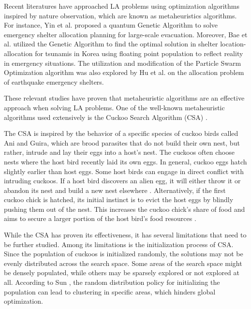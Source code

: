 \documentclass{article}
\begin{document}
Recent literatures have approached LA problems using optimization algorithms inspired by nature observation, which are known as metaheuristics algorithms. For instance, Yin et al. \cite{10.3389/fpubh.2022.1098675} proposed a quantum Genetic Algorithm to solve emergency shelter allocation planning for large-scale evacuation. Moreover, Bae et al. \cite{bae2019shelter} utilized the Genetic Algorithm to find the optimal solution in shelter location-allocation for tsunamis in Korea using floating point population to reflect reality in emergency situations. The utilization and modification of the Particle Swarm Optimization algorithm was also explored by Hu et al. \cite{hu2012modified} on the allocation problem of earthquake emergency shelters. 

These relevant studies have proven that metaheuristic algorithms are an effective approach when solving LA problems. One of the well-known metaheuristic algorithms used extensively is the Cuckoo Search Algorithm (CSA) \cite{yang2009cuckoo}. 

The CSA is inspired by the behavior of a specific species of cuckoo birds called Ani and Guira, which are brood parasites that do not build their own nest, but rather, intrude and lay their eggs into a host’s nest. The cuckoos often choose nests where the host bird recently laid its own eggs. In general, cuckoo eggs hatch slightly earlier than host eggs. Some host birds can engage in direct conflict with intruding cuckoos. If a host bird discovers an alien egg, it will either throw it or abandon its nest and build a new nest elsewhere \cite{santos2012cuckoo}. Alternatively, if the first cuckoo chick is hatched, its initial instinct is to evict the host eggs by blindly pushing them out of the nest. This increases the cuckoo chick’s share of food and aims to secure a larger portion of the host bird’s food resources \cite{valian2011improved}.

While the CSA has proven its effectiveness, it has several limitations that need to be further studied. Among its limitations is the initialization process of CSA. Since the population of cuckoos is initialized randomly, the solutions may not be evenly distributed across the search space. Some areas of the search space might be densely populated, while others may be sparsely explored or not explored at all. According to Sun \cite{sun2024application}, the random distribution policy for initializing the population can lead to clustering in specific areas, which hinders global optimization. 
\end{document}
